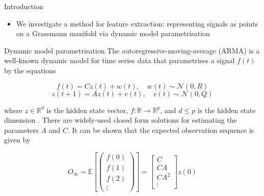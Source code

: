 \documentclass[final]{beamer}
\newlength{\onecolwid}
\begin{document}
\begin{frame}[t]
\begin{columns}[t]
\begin{column}{\onecolwid}
\begin{block}{Introduction}
\begin{itemize}
\begin{itemize}
\end{itemize}
 
        \item We investigate a  method for feature extraction: representing signals as points
            on a Grassmann manifold via dynamic model parametrisation
    \end{itemize}
\end{block}

\begin{block}{Dynamic model parametrisation}
    The autoregressive-moving-average (ARMA) is a well-known dynamic model for time series data that
    parametrises a signal $f(t)$ by the equations

    \begin{equation}
        f(t) = Cz(t) + w(t), \quad w(t) \sim \mathcal{N}(0, R)
    \end{equation}
    \begin{equation}
        z(t + 1) = Az(t) + v(t), \quad v(t) \sim \mathcal{N}(0, Q)
    \end{equation}

    where $z \in \mathbb{R}^d$ is the hidden state vector, $f : \mathbb{R} \rightarrow
    \mathbb{R}^p$, and $d \leq p$ is the hidden state dimension \cite{turaga_statistical_2011}.
    There are widely-used closed form solutions for estimating the parameters $A$ and $C$. It can be
    shown \cite{turaga_statistical_2011} that the expected observation sequence is given by

    \begin{equation}\label{eq:observation}
        O_\infty = \mathbb{E}\left[\begin{pmatrix} f(0) \\ f(1) \\ f(2) \\ \vdots
            \end{pmatrix}\right] = \begin{bmatrix} C \\ CA \\ CA^2 \\ \vdots \end{bmatrix} z(0)
    \end{equation}
\end{block}



\end{column}
\end{columns}
\end{frame}
\end{document}
